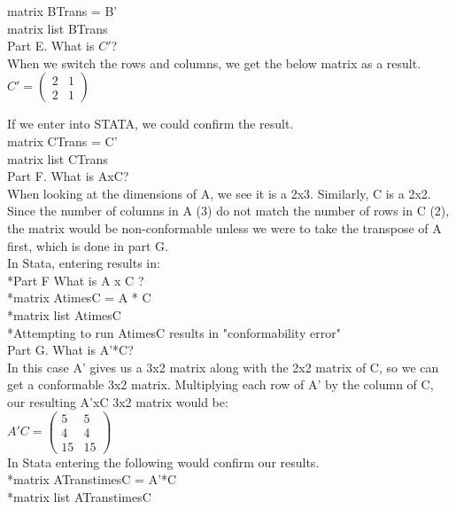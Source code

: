 \documentclass[11pt]{article}
\begin{document}
matrix BTrans = B'\\
matrix list BTrans\\

Part E. What is $C'$?\\

When we switch the rows and columns, we get the below matrix as a result.\\

$C' = \left( \begin{smallmatrix} 2&1\\2&1 \end{smallmatrix} \right)$

If we enter into STATA, we could confirm the result.\\

matrix CTrans = C'\\
matrix list CTrans\\

Part F. What is AxC?\\

When looking at the dimensions of A, we see it is a 2x3. Similarly, C is a 2x2. Since the number of columns in A (3) do not match the number of rows in C (2), the matrix would be non-conformable unless we were to take the transpose of A first, which is done in part G.\\

In Stata, entering results in:\\
*Part F What is A x C ?\\
*matrix AtimesC = A * C\\
*matrix list AtimesC\\
*Attempting to run AtimesC results in "conformability error" \\

Part G. What is A'*C?\\

In this case A' gives us a 3x2 matrix along with the 2x2 matrix of C, so we can get a conformable 3x2 matrix. Multiplying each row of A' by the column of C, our resulting A'xC 3x2 matrix would be:\\

$ A'C= \left( \begin{smallmatrix} 5&5\\4&4\\15&15 \end{smallmatrix} \right)$ \\

In Stata entering the following would confirm our results.\\
*matrix ATranstimesC = A'*C\\
*matrix list ATranstimesC\\
\end{document}
